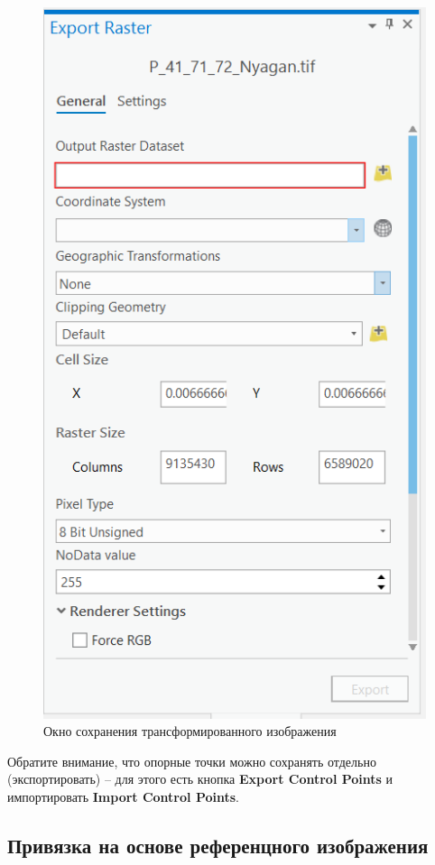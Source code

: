 \documentclass[
  12pt,
]{book}
\begin{document}
\begin{figure}
\centering
\includegraphics{images/Ref02/Arc_export_raster.png}
\caption{Окно сохранения трансформированного изображения}
\end{figure}

Обратите внимание, что опорные точки можно сохранять отдельно (экспортировать) -- для этого есть кнопка \textbf{Export Control Points} и импортировать \textbf{Import Control Points}.

\hypertarget{ux43fux440ux438ux432ux44fux437ux43aux430-ux43dux430-ux43eux441ux43dux43eux432ux435-ux440ux435ux444ux435ux440ux435ux43dux446ux43dux43eux433ux43e-ux438ux437ux43eux431ux440ux430ux436ux435ux43dux438ux44f}{%
\subsection{Привязка на основе референцного изображения}\label{ux43fux440ux438ux432ux44fux437ux43aux430-ux43dux430-ux43eux441ux43dux43eux432ux435-ux440ux435ux444ux435ux440ux435ux43dux446ux43dux43eux433ux43e-ux438ux437ux43eux431ux440ux430ux436ux435ux43dux438ux44f}}
\end{document}
